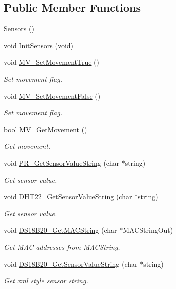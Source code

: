 \subsection*{Public Member Functions}
\begin{DoxyCompactItemize}
\item 
\hyperlink{classSensors_1_1Sensors_ac30fb5f0365448e41bb452884d7a3a83}{Sensors} ()
\item 
void \hyperlink{classSensors_1_1Sensors_a266e3c68574f125f214528c267723a3d}{Init\+Sensors} (void)
\item 
void \hyperlink{classSensors_1_1Sensors_adf426a126fdf97ab46e8816bea9fc38a}{M\+V\+\_\+\+Set\+Movement\+True} ()
\begin{DoxyCompactList}\small\item\em Set movement flag. \end{DoxyCompactList}\item 
void \hyperlink{classSensors_1_1Sensors_a17bd8b2ff819fce13ecfbfbd4f74c0ab}{M\+V\+\_\+\+Set\+Movement\+False} ()
\begin{DoxyCompactList}\small\item\em Set movement flag. \end{DoxyCompactList}\item 
bool \hyperlink{classSensors_1_1Sensors_ac4150d860e2182a70aeb1bbbba371f03}{M\+V\+\_\+\+Get\+Movement} ()
\begin{DoxyCompactList}\small\item\em Get movement. \end{DoxyCompactList}\item 
void \hyperlink{classSensors_1_1Sensors_a4881149a3a797fad4b58e1fea10e8d39}{P\+R\+\_\+\+Get\+Sensor\+Value\+String} (char $\ast$string)
\begin{DoxyCompactList}\small\item\em Get sensor value. \end{DoxyCompactList}\item 
void \hyperlink{classSensors_1_1Sensors_a633a1ff54564aa6f02093556c0a6b642}{D\+H\+T22\+\_\+\+Get\+Sensor\+Value\+String} (char $\ast$string)
\begin{DoxyCompactList}\small\item\em Get sensor value. \end{DoxyCompactList}\item 
void \hyperlink{classSensors_1_1Sensors_af888700f7df3903e91f4aaf4a5c46007}{D\+S18\+B20\+\_\+\+Get\+M\+A\+C\+String} (char $\ast$M\+A\+C\+String\+Out)
\begin{DoxyCompactList}\small\item\em Get M\+AC addresses from M\+A\+C\+String. \end{DoxyCompactList}\item 
void \hyperlink{classSensors_1_1Sensors_ae55034345130ef7b24d1f0cc3718c655}{D\+S18\+B20\+\_\+\+Get\+Sensor\+Value\+String} (char $\ast$string)
\begin{DoxyCompactList}\small\item\em Get xml style sensor string. \end{DoxyCompactList}\end{DoxyCompactItemize}
